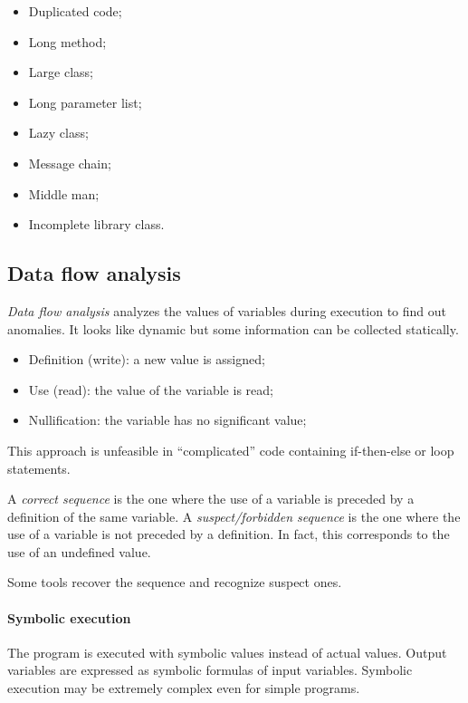 \begin{multicols}{2}
\begin{itemize}
\item Duplicated code;
\item Long method;
\item Large class;
\item Long parameter list;
\item Lazy class;
\item Message chain;
\item Middle man;
\item Incomplete library class.
\end{itemize}
\end{multicols}

\subsection{Data flow analysis}
\emph{Data flow analysis} analyzes the values of variables during execution to find out anomalies. It looks like dynamic but some information can be collected statically.
\begin{itemize}
\item Definition (write): a new value is assigned;
\item Use (read): the value of the variable is read;
\item Nullification: the variable has no significant value;
\end{itemize}
This approach is unfeasible in ``complicated'' code containing if-then-else or loop statements.

A \emph{correct sequence} is the one where the use of a variable is preceded by a definition of the same variable. A \emph{suspect/forbidden sequence} is the one where the use of a variable is not preceded by a definition. In fact, this corresponds to the use of an undefined value.

Some tools recover the sequence and recognize suspect ones.

\paragraph{Symbolic execution}
The program is executed with symbolic values instead of actual values. Output variables are expressed as symbolic formulas of input variables. Symbolic execution may be extremely complex even for simple programs.